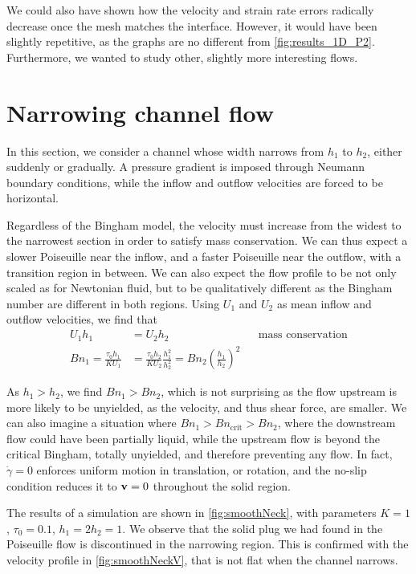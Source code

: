 \documentclass[11 pt]{report}
\begin{document}
We could also have shown how the velocity and strain rate errors radically decrease once the mesh matches the interface. However, it would have been slightly repetitive, as the graphs are no different from \cref{fig:results_1D_P2}. Furthermore, we wanted to study other, slightly more interesting flows.

\section{Narrowing channel flow}
In this section, we consider a channel whose width narrows from $h_1$ to $h_2$, either suddenly or gradually. A pressure gradient is imposed through Neumann boundary conditions, while the inflow and outflow velocities are forced to be horizontal.

Regardless of the Bingham model, the velocity must increase from the widest to the narrowest section in order to satisfy mass conservation. We can thus expect a slower Poiseuille near the inflow, and a faster Poiseuille near the outflow, with a transition region in between. We can also expect the flow profile to be not only scaled as for Newtonian fluid, but to be qualitatively different as the Bingham number are different in both regions. Using $U_1$ and $U_2$ as mean inflow and outflow velocities, we find that
\begin{equation}
    \begin{aligned}
        U_1 h_1 &= U_2 h_2 &&\text{mass conservation}\\
        Bn_{1} = \frac{\tau_0 h_1}{K U_1} &= \frac{\tau_0 h_2}{K U_2} \frac{h_1^2}{h_2^2} = Bn_{2} \left(\frac{h_1}{h_2}\right)^2
    \end{aligned}
\end{equation}

As $h_1>h_2$, we find $Bn_1>Bn_2$, which is not surprising as the flow upstream is more likely to be unyielded, as the velocity, and thus shear force, are smaller. We can also imagine a situation where $Bn_1>Bn_{\text{crit}}>Bn_2$, where the downstream flow could have been partially liquid, while the upstream flow is beyond the critical Bingham, totally unyielded, and therefore preventing any flow. In fact, $\dot\gamma=0$ enforces uniform motion in translation, or rotation, and the no-slip condition reduces it to $\mathbf{v}=0$ throughout the solid region.

The results of a simulation are shown in \cref{fig:smoothNeck}, with parameters $K=1$, $\tau_0=0.1$, $h_1=2h_2=1$. We observe that the solid plug we had found in the Poiseuille flow is discontinued in the narrowing region. This is confirmed with the velocity profile in \cref{fig:smoothNeckV}, that is not flat when the channel narrows. 
\end{document}
